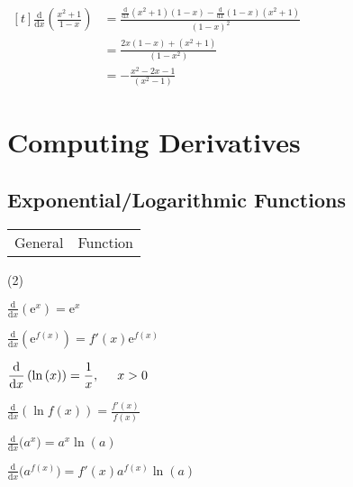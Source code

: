 \documentclass[11pt,a4paper]{book}
\begin{document}
\begin{example}
\begin{tasks}[label=(\alph*),label-width=3.5ex,after-item-skip = 1cm]
\task
$
\begin{aligned}[t]
{\displaystyle \frac{\mathrm{d}}{\mathrm{d}x}\left({\displaystyle \frac{x^{2}+1}{1-x}}\right)} & =\frac{\frac{\mathrm{d}}{\mathrm{d}x}\left(x^{2}+1\right)\left(1-x\right)-\frac{\mathrm{d}}{\mathrm{d}x}\left(1-x\right)\left(x^{2}+1\right)}{\left(1-x\right)^{2}}\\
 & =\frac{2x\left(1-x\right)+\left(x^{2}+1\right)}{\left(1-x^{2}\right)}\\
 & =-\frac{x^{2}-2x-1}{\left(x^{2}-1\right)}
\end{aligned}
$

\end{tasks}

\end{example}

\newpage

\section{Computing Derivatives}

\subsection{Exponential/Logarithmic Functions}

\begin{tcolorbox}[colback=blue!5, colframe=black, boxrule=.4pt, sharpish corners]

\begin{tabular}{>{\centering}p{4.5cm}>{\centering}p{10cm}}
General & Function\tabularnewline
\end{tabular}

\begin{tasks}[style=itemize,label-width=3.5ex](2)

\task  ${\displaystyle \frac{\mathrm{d}}{\mathrm{d}x}\left(\mathrm{e}^{x}\right)=\mathrm{e}^{x}}$

\task  ${\displaystyle \frac{\mathrm{d}}{\mathrm{d}x}\left(\mathrm{e}^{f(x)}\right)=f'(x)\mathrm{e}^{f(x)}}$

\task  ${\displaystyle \frac{\mathrm{d}}{\mathrm{d}x}\left(\ln\left(x\right)\right)=\frac{1}{x},\hspace{0.5cm}x>0}$

\task  ${\displaystyle \frac{\mathrm{d}}{\mathrm{d}x}\left(\ln f\left(x\right)\right)=\frac{f'(x)}{f(x)}}$

\task  ${\displaystyle \frac{\mathrm{d}}{\mathrm{d}x}(}a^{x})=a^{x}\ln(a)$

\task  ${\displaystyle \frac{\mathrm{d}}{\mathrm{d}x}(}a^{f(x)})=f'(x)a^{f(x)}\ln(a)$

\end{tasks}
\end{tcolorbox}
\end{document}
